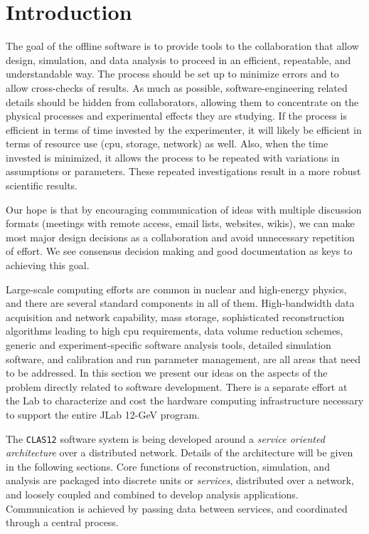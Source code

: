 \section{Introduction}

The goal of the offline software is to provide tools to the collaboration 
that allow design, simulation, and data analysis to proceed in an efficient, 
repeatable, and understandable way.  The process should be set up to minimize 
errors and to allow cross-checks of results.  As much as possible, 
software-engineering related details should be hidden from collaborators,
allowing them to concentrate on the physical processes and experimental 
effects they are studying.  If the process is efficient in terms of time 
invested by the experimenter, it will likely be efficient in terms of resource 
use (cpu, storage, network) as well.  Also, when the time invested is 
minimized, it allows the process to be repeated with variations in 
assumptions or parameters. These repeated investigations result in a more 
robust scientific results.

Our hope is that by encouraging communication of ideas with multiple 
discussion formats (meetings with remote access, email lists, websites, 
wikis), we can make most major design decisions as a collaboration and avoid 
unnecessary repetition of effort.  We see consensus decision making and good 
documentation as keys to achieving this goal.

Large-scale computing efforts are common in nuclear and high-energy physics, 
and there are several standard components in all of them.  High-bandwidth data 
acquisition and network capability, mass storage, sophisticated reconstruction 
algorithms leading to high cpu requirements, data volume reduction schemes, 
generic and experiment-specific software analysis tools, detailed simulation 
software, and calibration and run parameter management, are all areas that 
need to be addressed.  In this section we present our ideas on the aspects of 
the problem directly related to software development.  There is a separate 
effort at the Lab to characterize and cost the hardware computing 
infrastructure necessary to support the entire JLab 12-GeV program.

The {\tt CLAS12} software system is being developed around a {\it service 
oriented architecture} over a distributed network.  Details of the 
architecture will be given in the following sections.  Core functions of 
reconstruction, simulation, and analysis are packaged into discrete units or 
{\it services}, distributed over a network, and loosely coupled and combined 
to develop analysis applications.  Communication is achieved by passing data 
between services, and coordinated through a central process.

